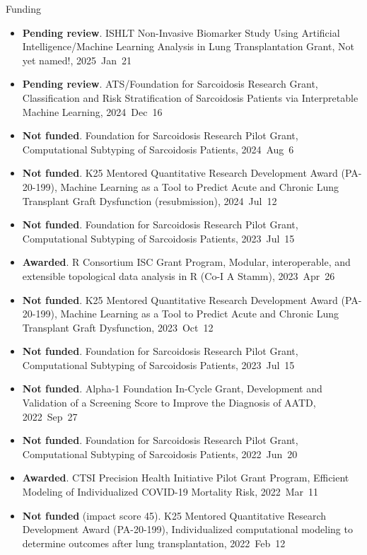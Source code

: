 \documentclass[10pt,a4paper]{article}
\begin{document}
\vspace{.25cm}
{\sc Funding}
\begin{itemize}[label=$\circ$,nolistsep]
\item
{\bfseries Pending review}. ISHLT Non-Invasive Biomarker Study Using Artificial Intelligence/Machine Learning Analysis in Lung Transplantation Grant, Not yet named!, 2025~Jan~21
\item
{\bfseries Pending review}. ATS/Foundation for Sarcoidosis Research Grant, Classification and Risk Stratification of Sarcoidosis Patients via Interpretable Machine Learning, 2024~Dec~16
\item
{\bfseries Not funded}. Foundation for Sarcoidosis Research Pilot Grant, Computational Subtyping of Sarcoidosis Patients, 2024~Aug~6
\item
{\bfseries Not funded}. K25 Mentored Quantitative Research Development Award (PA-20-199), Machine Learning as a Tool to Predict Acute and Chronic Lung Transplant Graft Dysfunction (resubmission), 2024~Jul~12
\item
{\bfseries Not funded}. Foundation for Sarcoidosis Research Pilot Grant, Computational Subtyping of Sarcoidosis Patients, 2023~Jul~15
\item
{\bfseries Awarded}. R Consortium ISC Grant Program, Modular, interoperable, and extensible topological data analysis in R (Co-I A Stamm), 2023~Apr~26
\item
{\bfseries Not funded}. K25 Mentored Quantitative Research Development Award (PA-20-199), Machine Learning as a Tool to Predict Acute and Chronic Lung Transplant Graft Dysfunction, 2023~Oct~12
\item
{\bfseries Not funded}. Foundation for Sarcoidosis Research Pilot Grant, Computational Subtyping of Sarcoidosis Patients, 2023~Jul~15
\item
{\bfseries Not funded}. Alpha-1 Foundation In-Cycle Grant, Development and Validation of a Screening Score to Improve the Diagnosis of AATD, 2022~Sep~27
\item
{\bfseries Not funded}. Foundation for Sarcoidosis Research Pilot Grant, Computational Subtyping of Sarcoidosis Patients, 2022~Jun~20
\item
{\bfseries Awarded}. CTSI Precision Health Initiative Pilot Grant Program, Efficient Modeling of Individualized COVID-19 Mortality Risk, 2022~Mar~11
\item
{\bfseries Not funded} (impact score 45). K25 Mentored Quantitative Research Development Award (PA-20-199), Individualized computational modeling to determine outcomes after lung transplantation, 2022~Feb~12

\end{itemize}
\end{document}
